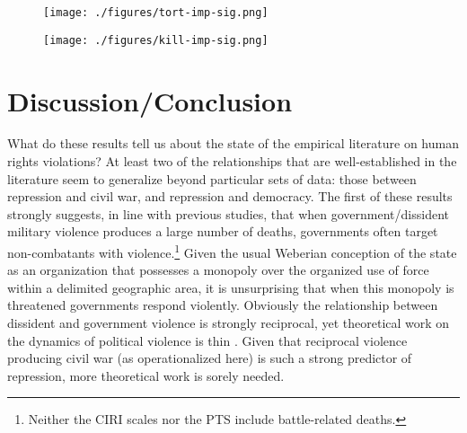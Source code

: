 \documentclass[12pt]{article}
\begin{document}
\begin{figure}[!htpb]
\centering
\texttt{[image: ./figures/tort-imp-sig.png]}
\caption{}
\label{tort-imp}
\end{figure}

\begin{figure}[!htpb]
\centering
\texttt{[image: ./figures/kill-imp-sig.png]}
\caption{}
\label{kill-imp}
\end{figure}

\section{Discussion/Conclusion}

What do these results tell us about the state of the empirical literature on human rights violations? At least two of the relationships that are well-established in the literature seem to generalize beyond particular sets of data: those between repression and civil war, and repression and democracy. The first of these results strongly suggests, in line with previous studies, that when government/dissident military violence produces a large number of deaths, governments often target non-combatants with violence.\footnote{Neither the CIRI scales nor the PTS include battle-related deaths.} Given the usual Weberian conception of the state as an organization that possesses a monopoly over the organized use of force within a delimited geographic area, it is unsurprising that when this monopoly is threatened governments respond violently. Obviously the relationship between dissident and government violence is strongly reciprocal, yet theoretical work on the dynamics of political violence is thin \citep[But see, e.g.][]{Moore2000,Pierskalla2010,RitterJCR}. Given that reciprocal violence producing civil war (as operationalized here) is such a strong predictor of repression, more theoretical work is sorely needed. 
\end{document}

